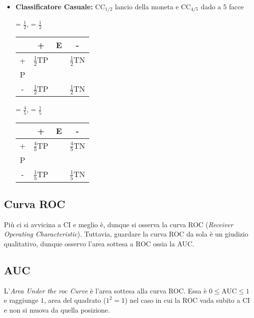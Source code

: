 \documentclass[11pt]{report}
\begin{document}
\begin{itemize}
	\item \textbf{Classificatore Casuale:} $\text{CC}_{1/2}$ lancio della moneta e $\text{CC}_{4/5}$ dado a 5 facce
    \begin{center}
        \begin{minipage}{0.5\textwidth}
            \begin{center}
                 = $\frac{1}{2}$,  = $\frac{1}{2}$
                \hfill
                \begin{tabular}{ c| c c c }
                & + & E & - \\
                \hline
                + & $\frac{1}{2}$TP & & $\frac{1}{2}$TN \\
                P \\
                - & $\frac{1}{2}$TP & & $\frac{1}{2}$TN
                \end{tabular}
            \end{center}
        \end{minipage}
    \end{center}
    \begin{center}
        \begin{minipage}{0.5\textwidth}
            \begin{center}
                 = $\frac{4}{5}$,  = $\frac{1}{5}$
                \hfill
                \begin{tabular}{ c| c c c }
                & + & E & - \\
                \hline
                + & $\frac{4}{5}$TP & & $\frac{4}{5}$TN \\
                P \\
                - & $\frac{1}{5}$TP & & $\frac{1}{5}$TN
                \end{tabular}
            \end{center}
        \end{minipage}
    \end{center}
\end{itemize}
\subsection{Curva ROC}
Più ci si avvicina a CI e meglio è, dunque si osserva la curva ROC (\textit{Receiver Operating Characteristic}). Tuttavia, guardare la curva ROC da sola è un giudizio qualitativo, dunque osservo l'area sottesa a ROC ossia la AUC.
\subsection{AUC}
L'\textit{Area Under the roc Curve} è l'area sottesa alla curva ROC. Essa è $0 \leq \text{AUC} \leq 1$ e raggiunge $1$, area del quadrato ($1^2 = 1$) nel caso in cui la ROC vada subito a CI e non si muova da quella posizione.
\begin{center}
    
\end{center}
\end{document}
